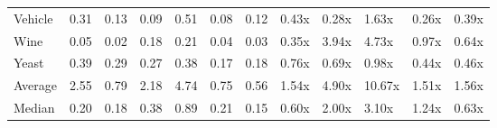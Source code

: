 \begin{tabular}{llllllllllll}
Vehicle             &     0.31 &  0.13 &   0.09 &   0.51 &  0.08 &  0.12 &    0.43x &   0.28x &   1.63x &  0.26x &  0.39x \\
Wine                &     0.05 &  0.02 &   0.18 &   0.21 &  0.04 &  0.03 &    0.35x &   3.94x &   4.73x &  0.97x &  0.64x \\
Yeast               &     0.39 &  0.29 &   0.27 &   0.38 &  0.17 &  0.18 &    0.76x &   0.69x &   0.98x &  0.44x &  0.46x \\
Average             &     2.55 &  0.79 &   2.18 &   4.74 &  0.75 &  0.56 &    1.54x &   4.90x &  10.67x &  1.51x &  1.56x \\
Median              &     0.20 &  0.18 &   0.38 &   0.89 &  0.21 &  0.15 &    0.60x &   2.00x &   3.10x &  1.24x &  0.63x \\
\bottomrule
\end{tabular}
